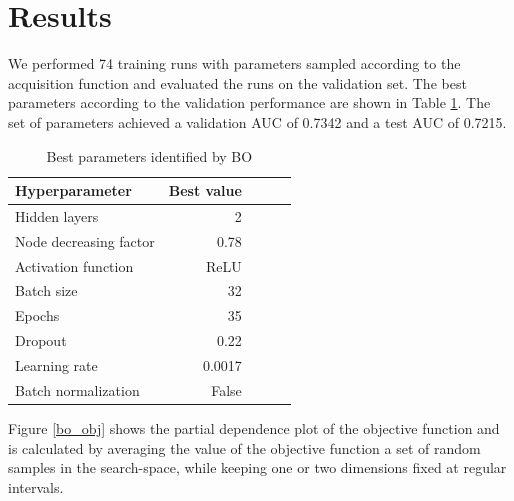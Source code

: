 \documentclass[bsc,frontabs,twoside,singlespacing,parskip,deptreport]{infthesis}     %
\let\Oldsection\section
\renewcommand{\section}{\FloatBarrier\Oldsection}
\begin{document}
\section{Results}
We performed 74 training runs with parameters sampled according to the acquisition function and evaluated the runs on the validation set. The best parameters according to the validation performance are shown in Table \ref{bo_results}.
The set of parameters achieved a validation AUC of 0.7342 and a test AUC of 0.7215.
\begin{table}[h!]
\centering
\begin{tabular}{lrrrr}
\toprule
{Hyperparameter} &  Best value  \\
\midrule
Hidden layers & 2 \\
Node decreasing factor & 0.78 \\
Activation function & ReLU \\
Batch size & 32 \\
Epochs & 35 \\
Dropout & 0.22 \\
Learning rate & 0.0017  \\
Batch normalization & False \\
\bottomrule
\end{tabular}
\caption{Best parameters identified by BO}\label{bo_results}
\end{table}
Figure \ref{bo_obj} shows the partial dependence plot of the objective function and is calculated by averaging the value of the objective function a set of random samples in the search-space, while keeping one or two dimensions fixed at regular intervals. 
\end{document}
